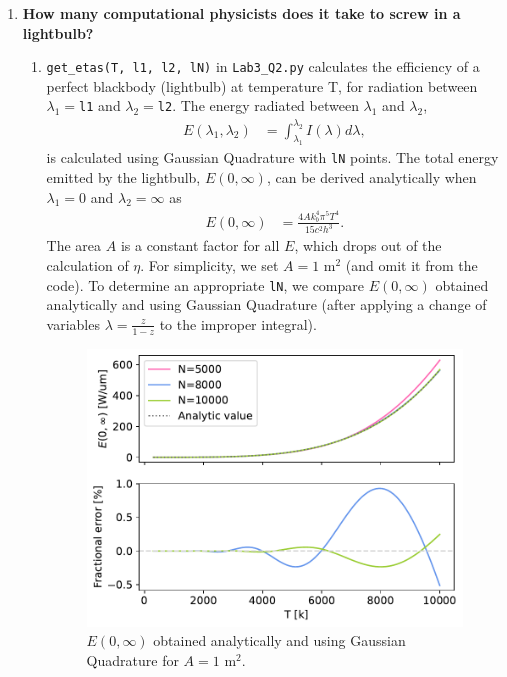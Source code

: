 \documentclass{article}
\newcommand{\code}{\texttt}
\begin{document}
\begin{enumerate}
\item \textbf{How many computational physicists does it take to screw in a lightbulb?}
\begin{enumerate}
  \item \code{get\_etas(T, l1, l2, lN)} in \code{Lab3\_Q2.py} calculates the efficiency of a perfect blackbody (lightbulb) at temperature T, 
  for radiation between $\lambda_1=$\code{l1} and $\lambda_2=$\code{l2}. The energy radiated between $\lambda_1$ and $\lambda_2$,
  \begin{align}
    E(\lambda_1,\lambda_2) &= \int_{\lambda_1}^{\lambda_2}I(\lambda)d\lambda,
  \end{align}
  is calculated using Gaussian Quadrature with \code{lN} points. The total energy emitted by the lightbulb, $E(0, \infty)$, can be derived analytically when $\lambda_1=0$ and $\lambda_2=\infty$ as 
  \begin{align}
    E(0, \infty) &= \frac{4Ak_b^4\pi^5T^4}{15c^2h^3}.
  \end{align} 
  The area $A$ is a constant factor for all $E$, which drops out of the calculation of $\eta$. For simplicity, we set $A=1$ m$^2$  (and omit it from the code). To determine an appropriate \code{lN}, we compare $E(0,\infty)$ obtained analytically and using Gaussian Quadrature (after applying a change of variables $\lambda=\frac{z}{1-z}$ to the improper integral). 
  \begin{figure}[H]
    \centering 
    \captionsetup{margin=3.2cm}
    \includegraphics[width=0.48\linewidth]{Q2a.pdf}
    \caption{\label{fig:2a} $E(0,\infty)$ obtained analytically and using Gaussian Quadrature for $A=1$ m$^2$.}
    \end{figure}


\end{enumerate}
\end{enumerate}
\end{document}
